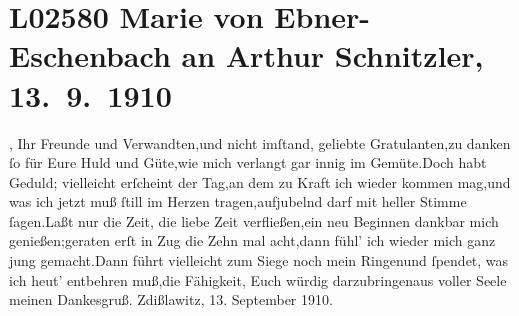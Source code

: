 

\section[Marie von Ebner-Eschenbach an Arthur Schnitzler, 13. 9. 1910]{L02580 Marie von Ebner-Eschenbach an Arthur Schnitzler, 13. 9. 1910}
\nopagebreak{}
\rehead{ }\normalsize\beginnumbering{}
\toendnotes[C]{\smallbreak\pagebreak[2]}
\toendnotes[C]{\smallbreak}
\toendnotes[C]{\smallbreak}\stanza{}{\pb}\label{K_L02580-1v}\label{K_L02580-1}, Ihr Freunde und
                  Verwandten,\newverse{}und nicht imſtand, geliebte Gratulanten,\newverse{}zu danken{ }ſo für Eure Huld und Güte,\newverse{}wie mich verlangt gar innig im Gemüte.\newverse{}Doch habt Geduld; vielleicht erſcheint der Tag,\newverse{}an dem zu Kraft ich wieder kommen mag,\newverse{}und was ich jetzt muß{ }ſtill im Herzen tragen,\newverse{}aufjubelnd darf mit heller Stimme{ }ſagen.\newverse{}Laßt nur die Zeit, die liebe Zeit verfließen,\newverse{}ein neu Beginnen dankbar mich genießen;\newverse{}geraten erſt in Zug die Zehn mal acht,\newverse{}dann fühl’ ich wieder mich ganz jung gemacht.\newverse{}Dann führt vielleicht zum Siege noch mein Ringen\newverse{}und{ }ſpendet, was ich heut’ entbehren muß,\newverse{}die Fähigkeit, Euch würdig darzubringen\newverse{}aus voller Seele meinen Dankesgruß.\stanzaend{}\pstart \spacefill\mbox{}\pend{}
\pstart
           Zdißlawitz, 13. September 1910.\pend
           \endnumbering{}  \newcommand{\dateiname}{L02580}\newcommand{\titel}{Marie von Ebner-Eschenbach an Arthur Schnitzler, 13. 9. 1910}\newcommand{\editorInnen}{Martin Anton Müller und Laura Untner}
